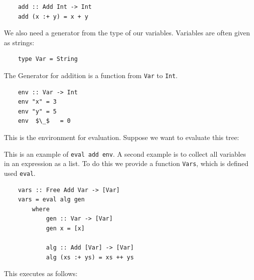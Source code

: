 \documentclass[a4paper,12pt]{article}
\theoremstyle{remark}
\begin{document}
\begin{lstlisting}
    add :: Add Int -> Int
    add (x :+ y) = x + y  \end{lstlisting}

We also need a generator from the type of our variables. Variables are often given
as strings:

\begin{lstlisting}
    type Var = String  \end{lstlisting}

The Generator for addition is a function from \lstinline{Var} to \lstinline{Int}.

\begin{lstlisting}
    env :: Var -> Int
    env "x" = 3
    env "y" = 5
    env  $\_$   = 0  \end{lstlisting}

This is the environment for evaluation. Suppose we want to evaluate this tree:

\begin{figure}[H]
  \centering
\end{figure}

This is an example of \lstinline{eval add env}. A second example is to collect all
variables in an expression as a list. To do this we provide a function \lstinline{Vars},
which is defined used \lstinline{eval}.

\begin{lstlisting}
    vars :: Free Add Var -> [Var]
    vars = eval alg gen
        where
            gen :: Var -> [Var]
            gen x = [x]

            alg :: Add [Var] -> [Var]
            alg (xs :+ ys) = xs ++ ys  \end{lstlisting}

This executes as follows:

\begin{figure}[H]
  \centering
\end{figure}
\end{document}
